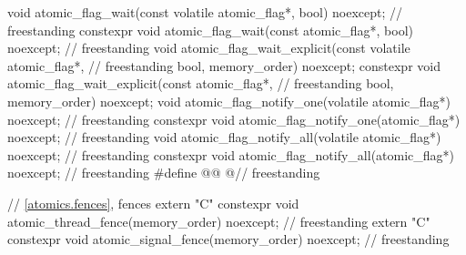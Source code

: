 \begin{codeblock}
{  void atomic_flag_wait(const volatile atomic_flag*, bool) noexcept;                // freestanding
  constexpr void atomic_flag_wait(const atomic_flag*, bool) noexcept;               // freestanding
  void atomic_flag_wait_explicit(const volatile atomic_flag*,                       // freestanding
                                 bool, memory_order) noexcept;
  constexpr void atomic_flag_wait_explicit(const atomic_flag*,                      // freestanding
                                           bool, memory_order) noexcept;
  void atomic_flag_notify_one(volatile atomic_flag*) noexcept;                      // freestanding
  constexpr void atomic_flag_notify_one(atomic_flag*) noexcept;                     // freestanding
  void atomic_flag_notify_all(volatile atomic_flag*) noexcept;                      // freestanding
  constexpr void atomic_flag_notify_all(atomic_flag*) noexcept;                     // freestanding
  #define @@ @\seebelownc@                                                // freestanding

  // \ref{atomics.fences}, fences
  extern "C" constexpr void atomic_thread_fence(memory_order) noexcept;             // freestanding
  extern "C" constexpr void atomic_signal_fence(memory_order) noexcept;             // freestanding
}
\end{codeblock}

